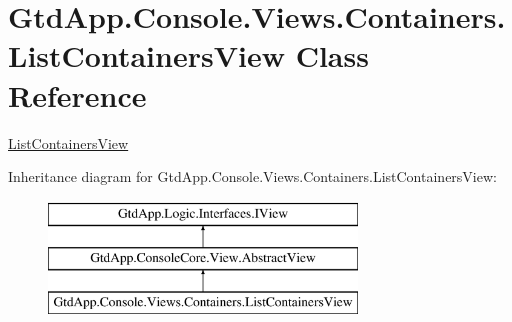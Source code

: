 \hypertarget{class_gtd_app_1_1_console_1_1_views_1_1_containers_1_1_list_containers_view}{}\section{Gtd\+App.\+Console.\+Views.\+Containers.\+List\+Containers\+View Class Reference}
\label{class_gtd_app_1_1_console_1_1_views_1_1_containers_1_1_list_containers_view}


\mbox{\hyperlink{class_gtd_app_1_1_console_1_1_views_1_1_containers_1_1_list_containers_view}{List\+Containers\+View}}  


Inheritance diagram for Gtd\+App.\+Console.\+Views.\+Containers.\+List\+Containers\+View\+:\begin{figure}[H]
\begin{center}
\leavevmode
\includegraphics[height=3.000000cm]{class_gtd_app_1_1_console_1_1_views_1_1_containers_1_1_list_containers_view}
\end{center}
\end{figure}
